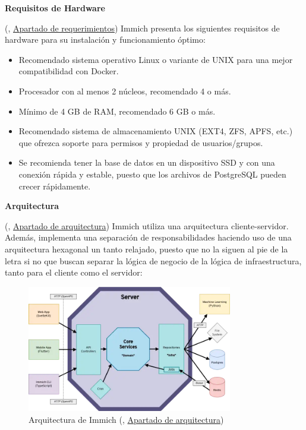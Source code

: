 \textbf{Requisitos de Hardware}

(\cite{immich-documentation}, \href{https://immich.app/docs/install/requirements}{Apartado de requerimientos}) Immich presenta los siguientes requisitos de hardware para su instalación y funcionamiento óptimo:

\begin{itemize}
    \item Recomendado sistema operativo Linux o variante de UNIX para una mejor compatibilidad con Docker.
    \item Procesador con al menos 2 núcleos, recomendado 4 o más.
    \item Mínimo de 4 GB de RAM, recomendado 6 GB o más.
    \item Recomendado sistema de almacenamiento UNIX (EXT4, ZFS, APFS, etc.) que ofrezca soporte para permisos y propiedad de usuarios/grupos.
    \item Se recomienda tener la base de datos en un dispositivo SSD y con una conexión rápida y estable, puesto que los archivos de PostgreSQL pueden crecer rápidamente.
\end{itemize}

\textbf{Arquitectura}

(\cite{immich-documentation}, \href{https://immich.app/docs/developer/architecture/}{Apartado de arquitectura}) Immich utiliza una arquitectura cliente-servidor. Además, implementa una separación de responsabilidades haciendo uso de una arquitectura hexagonal un tanto relajado, puesto que no la siguen al pie de la letra si no que buscan separar la lógica de negocio de la lógica de infraestructura, tanto para el cliente como el servidor:

\begin{figure}[H]
  \centering
  \includegraphics[width=0.8\textwidth]{assets/immich-architecture.png}
  \caption{Arquitectura de Immich (\cite{immich-documentation}, \href{https://immich.app/docs/developer/architecture/}{Apartado de arquitectura})}
  \label{fig:immich-architecture}
\end{figure}


